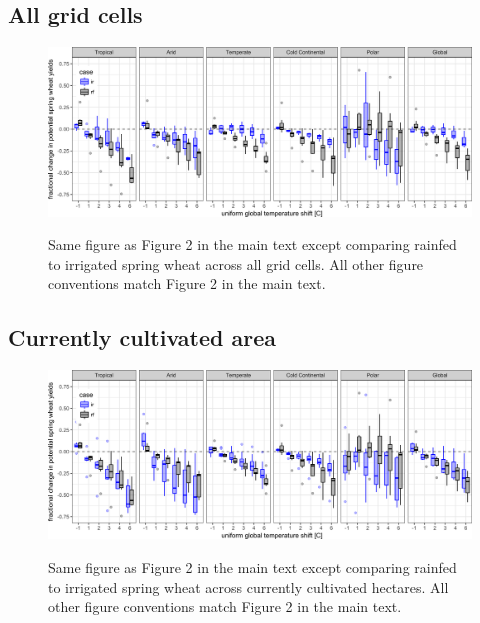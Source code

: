 \documentclass[10pt]{article}
\begin{document}
\subsection{All grid cells}
\begin{figure}[h!]
\includegraphics[width=\textwidth]{s_spring_wheat_sim_CG.png}\\
\caption{Same figure as Figure 2 in the main text except comparing rainfed to irrigated spring wheat across all grid cells. All other figure conventions match Figure 2 in the main text.}
\label{fig:maizeCG}
\end{figure}

\subsection{Currently cultivated area}
\begin{figure}[h!]
\includegraphics[width=\textwidth]{s_spring_wheat_sim_CG_area_weight.png}\\
\caption{Same figure as Figure 2 in the main text except comparing rainfed to irrigated spring wheat across currently cultivated hectares. All other figure conventions match Figure 2 in the main text.}
\label{fig:maizeCG}
\end{figure}


\clearpage
\end{document}

